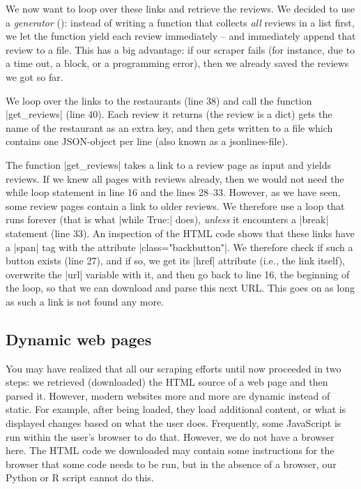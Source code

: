 We now want to loop over these links and retrieve the reviews.  We
decided to use a \emph{generator} (): instead of writing a
function that collects \emph{all} reviews in a list first, we let the
function yield each review immediately -- and immediately append that review
to a file. This has a big advantage: if our scraper fails (for
instance, due to a time out, a block, or a programming error), then we
already saved the reviews we got so far.

We loop over the links to the restaurants (line 38) and call the
function |get_reviews| (line 40). Each review it returns (the review
is a dict) gets the name of the restaurant as an extra key, and then
gets written to a file which contains one JSON-object per line (also
known as a jsonlines-file).

The function |get_reviews| takes a link to a review page as input and
yields reviews. If we knew all pages with reviews already, then we
would not need the while loop statement in line 16 and the lines
28--33. However, as we have seen, some review pages contain a link to
older reviews. We therefore use a loop that runs forever (that is what
|while True:| does), \emph{unless} it encounters a |break| statement
(line 33).  An inspection of the HTML code shows that these links have
a |span| tag with the attribute |class="backbutton"|. We therefore
check if such a button exists (line 27), and if so, we get its |href|
attribute (i.e., the link itself), overwrite the |url| variable with
it, and then go back to line 16, the beginning of the loop, so that we
can download and parse this next URL.  This goes on as long as such a
link is not found any more.



\subsection{Dynamic web pages}
\label{sec:selenium}

You may have realized that all our scraping efforts until now
proceeded in two steps: we retrieved (downloaded) the HTML source of a
web page and then parsed it. However, modern websites more and more
are dynamic instead of static. For example, after being loaded, they
load additional content, or what is displayed changes based on what
the user does. Frequently, some JavaScript is run within the user's
browser to do that. However, we do not have a browser here. The HTML
code we downloaded may contain some instructions for the browser that
some code needs to be run, but in the absence of a browser, our Python
or R script cannot do this.

